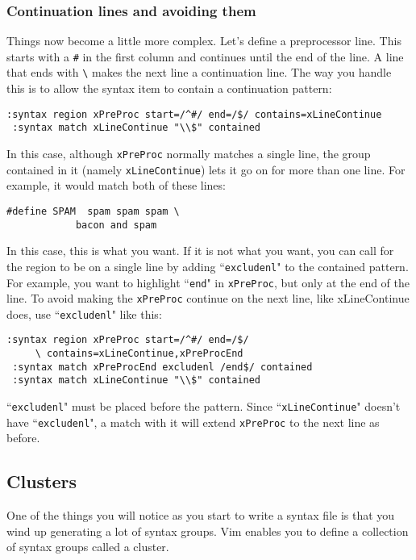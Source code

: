 \subsubsection{Continuation lines and avoiding them}
Things now become a little more complex.
Let's define a preprocessor line.
This starts with a \texttt{\#} in the first column and continues until the end of the line.
A line that ends with \texttt{\textbackslash{}} makes the next line a continuation line.
The way you handle this is to allow the syntax item to contain a continuation pattern:

\begin{Verbatim}[samepage=true]
 :syntax region xPreProc start=/^#/ end=/$/ contains=xLineContinue
 :syntax match xLineContinue "\\$" contained
\end{Verbatim}

In this case, although \texttt{xPreProc} normally matches a single line, the group contained in it (namely \texttt{xLineContinue}) lets it go on for more than one line.
For example, it would match both of these lines:

\begin{Verbatim}[samepage=true]
    #define SPAM  spam spam spam \
            bacon and spam
\end{Verbatim}

In this case, this is what you want.
If it is not what you want, you can call for the region to be on a single line by adding ``\texttt{excludenl}" to the contained pattern.
For example, you want to highlight ``\texttt{end}" in \texttt{xPreProc}, but only at the end of the line.
To avoid making the \texttt{xPreProc} continue on the next line, like xLineContinue does, use ``\texttt{excludenl}" like this:

\begin{Verbatim}[samepage=true]
 :syntax region xPreProc start=/^#/ end=/$/
     \ contains=xLineContinue,xPreProcEnd
 :syntax match xPreProcEnd excludenl /end$/ contained
 :syntax match xLineContinue "\\$" contained
\end{Verbatim}

``\texttt{excludenl}" must be placed before the pattern.
Since ``\texttt{xLineContinue}" doesn't have ``\texttt{excludenl}", a match with it will extend \texttt{xPreProc} to the next line as before.
\subsection{Clusters}
\label{Clusters}
One of the things you will notice as you start to write a syntax file is that you wind up generating a lot of syntax groups.
Vim enables you to define a collection of syntax groups called a cluster.

